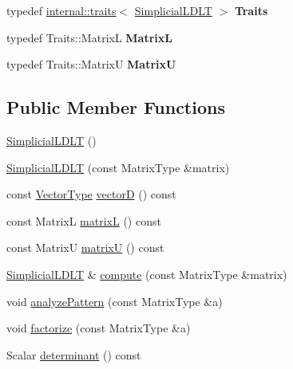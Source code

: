 \begin{DoxyCompactItemize}
\item 
\mbox{\label{class_eigen_1_1_simplicial_l_d_l_t_adcb202f95627052f2fcec1a443846c47}} 
typedef \mbox{\hyperlink{struct_eigen_1_1internal_1_1traits}{internal\+::traits}}$<$ \mbox{\hyperlink{class_eigen_1_1_simplicial_l_d_l_t}{Simplicial\+L\+D\+LT}} $>$ {\bfseries Traits}
\item 
\mbox{\label{class_eigen_1_1_simplicial_l_d_l_t_acfee89670dd30e7a362daf07993dc34f}} 
typedef Traits\+::\+MatrixL {\bfseries MatrixL}
\item 
\mbox{\label{class_eigen_1_1_simplicial_l_d_l_t_a44fd1f38eca9ea9eeba9947466104c18}} 
typedef Traits\+::\+MatrixU {\bfseries MatrixU}
\end{DoxyCompactItemize}
\subsection*{Public Member Functions}
\begin{DoxyCompactItemize}
\item 
\mbox{\hyperlink{class_eigen_1_1_simplicial_l_d_l_t_a3f26ae6105ffa36af9b8710e01e5caed}{Simplicial\+L\+D\+LT}} ()
\item 
\mbox{\hyperlink{class_eigen_1_1_simplicial_l_d_l_t_a07cb76aee396862f94c3eedc6d77d908}{Simplicial\+L\+D\+LT}} (const Matrix\+Type \&matrix)
\item 
const \mbox{\hyperlink{class_eigen_1_1_matrix}{Vector\+Type}} \mbox{\hyperlink{class_eigen_1_1_simplicial_l_d_l_t_abe54532ce80558a0474b11763702107b}{vectorD}} () const
\item 
const MatrixL \mbox{\hyperlink{class_eigen_1_1_simplicial_l_d_l_t_ae8f502eff0c95771115968510e4d9af5}{matrixL}} () const
\item 
const MatrixU \mbox{\hyperlink{class_eigen_1_1_simplicial_l_d_l_t_ae98ed1c7ce8f9165adf5fb08cbb36b70}{matrixU}} () const
\item 
\mbox{\hyperlink{class_eigen_1_1_simplicial_l_d_l_t}{Simplicial\+L\+D\+LT}} \& \mbox{\hyperlink{class_eigen_1_1_simplicial_l_d_l_t_a55429e59dbdf16a5696ee28bbf14e44f}{compute}} (const Matrix\+Type \&matrix)
\item 
void \mbox{\hyperlink{class_eigen_1_1_simplicial_l_d_l_t_aaf7c852056195d05de863362638517b7}{analyze\+Pattern}} (const Matrix\+Type \&a)
\item 
void \mbox{\hyperlink{class_eigen_1_1_simplicial_l_d_l_t_a8cf16bd92a712d36310397972bdef044}{factorize}} (const Matrix\+Type \&a)
\item 
Scalar \mbox{\hyperlink{class_eigen_1_1_simplicial_l_d_l_t_aa25042f3b49880f5e487d468ea20b1b7}{determinant}} () const
\end{DoxyCompactItemize}
